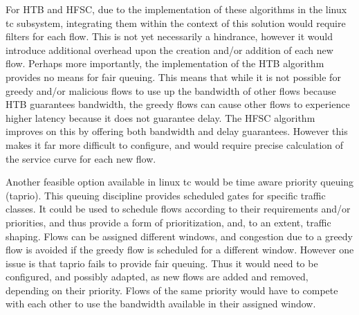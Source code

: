 For HTB and HFSC, due to the implementation of these algorithms in the linux tc subsystem, integrating them within the context of this solution would require filters for each flow. This is not yet necessarily a hindrance, however it would introduce additional overhead upon the creation and/or addition of each new flow. Perhaps more importantly, the implementation of the HTB algorithm provides no means for fair queuing. This means that while it is not possible for greedy and/or malicious flows to use up the bandwidth of other flows because HTB guarantees bandwidth, the greedy flows can cause other flows to experience higher latency because it does not guarantee delay. The HFSC algorithm improves on this by offering both bandwidth and delay guarantees. However this makes it far more difficult to configure, and would require precise calculation of the service curve for each new flow.

Another feasible option available in linux tc would be time aware priority queuing (taprio). This queuing discipline provides scheduled gates for specific traffic classes. It could be used to schedule flows according to their requirements and/or priorities, and thus provide a form of prioritization, and, to an extent, traffic shaping. Flows can be assigned different windows, and congestion due to a greedy flow is avoided if the greedy flow is scheduled for a different window. However one issue is that taprio fails to provide fair queuing. Thus it would need to be configured, and possibly adapted, as new flows are added and removed, depending on their priority. Flows of the same priority would have to compete with each other to use the bandwidth available in their assigned window.

